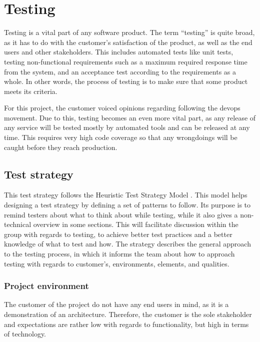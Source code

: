 
\chapter{Testing}
\label{chapterTesting}\label{chap:testing}

Testing is a vital part of any software product. The term ``testing'' is quite broad, as it has to do with the customer's satisfaction of the product, as well as the end users and other stakeholders. This includes automated tests like unit tests, testing non-functional requirements such as a maximum required response time from the system, and an acceptance test according to the requirements as a whole. In other words, the process of testing is to make sure that some product meets its criteria.

For this project, the customer voiced opinions regarding following the \acrshort{devops} movement. Due to this, testing becomes an even more vital part, as any release of any service will be tested mostly by automated tools and can be released at any time. This requires very high code coverage so that any wrongdoings will be caught before they reach production.

\section{Test strategy}
This test strategy follows the Heuristic Test Strategy Model \citep{htsm}. This model helps designing a test strategy by defining a set of patterns to follow. Its purpose is to remind testers about what to think about while testing, while it also gives a non-technical overview in some sections. This will facilitate discussion within the group with regards to testing, to achieve better test practices and a better knowledge of what to test and how. The strategy describes the general approach to the testing process, in which it informs the team about how to approach testing with regards to customer's, environments, elements, and qualities.

\subsection{Project environment}
The customer of the project do not have any end users in mind, as it is a demonstration of an architecture. Therefore, the customer is the sole stakeholder and expectations are rather low with regards to functionality, but high in terms of technology.

